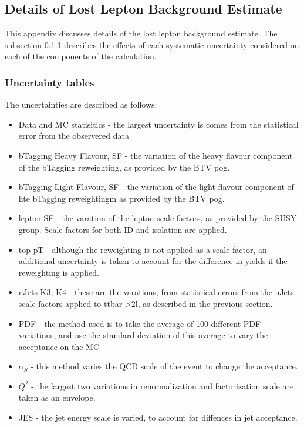\subsection{Details of Lost Lepton Background Estimate}
\label{sec:bkgLL_details}

This appendix discusses details of the lost lepton background estimate.  The subsection \ref{sec:bkgLL_details:tables} describes the effects of each systematic uncertainty considered on each of the components of the calculation.

\subsubsection{Uncertainty tables}
\label{sec:bkgLL_details:tables}

The uncertainties are described as follows:
\begin{itemize}
  \item Data and MC statisitics - the largest uncertainty is comes from the statistical error from the observered data
  \item bTagging Heavy Flavour, SF - the variation of the heavy flavour component of the bTagging reweighting, as provided by the BTV pog.
  \item bTagging Light Flavour, SF - the variation of the light flavour component of hte bTagging reweightingm as provided by the BTV pog.
  \item lepton SF - the varation of the lepton scale factors, as provided by the SUSY group.  Scale factors for both ID and isolation are applied.
  \item top pT  - although the reweighting is not applied as a scale factor, an additional uncertainty is taken to account for the difference in yields if the reweighting is applied. 
  \item nJets K3, K4 - these are the varations, from statistical errors from the nJets scale factors applied to ttbar->2l, as described in the previous section. 
  \item PDF - the method used is to take the average of 100 different PDF variations, and use the standard deviation of this average to vary the acceptance on the MC
  \item $\alpha_{S}$ - this method varies the QCD scale of the event to change the acceptance. 
  \item $Q^{2}$ - the largest two variations in renormalization and factorization scale are taken as an envelope.  
  \item JES - the jet energy scale is varied, to account for diffences in jet acceptance.  
\end{itemize}


